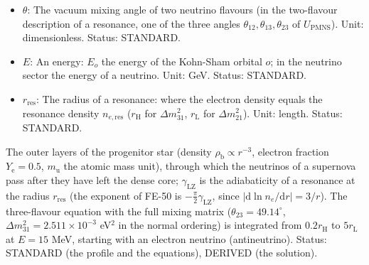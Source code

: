 \documentclass[
  10pt,
]{article}
\begin{document}
\begin{itemize}
  mass, \(m^2 = m_0^2 - \mathrm{i}m_0\Gamma_{\mathrm{bulk}}\) to the
  leading order; in the relic abundance of the particles \(\chi\) their
  mass. Unit: GeV. Status: STANDARD.
\item
  \(\theta\): The vacuum mixing angle of two neutrino flavours (in the
  two-flavour description of a resonance, one of the three angles
  \(\theta_{12}, \theta_{13}, \theta_{23}\) of \(U_{\mathrm{PMNS}}\)).
  Unit: dimensionless. Status: STANDARD.
\item
  \(E\): An energy: \(E_o\) the energy of the Kohn-Sham orbital \(o\);
  in the neutrino sector the energy of a neutrino. Unit: GeV. Status:
  STANDARD.
\item
  \(r_{\mathrm{res}}\): The radius of a resonance: where the electron
  density equals the resonance density \(n_{e,\mathrm{res}}\)
  (\(r_{\mathrm{H}}\) for \(\Delta m^2_{31}\), \(r_{\mathrm{L}}\) for
  \(\Delta m^2_{21}\)). Unit: length. Status: STANDARD.
\end{itemize}

The outer layers of the progenitor star (density
\(\rho_{\mathrm{b}} \propto r^{-3}\), electron fraction
\(Y_{\mathrm{e}} = 0.5\), \(m_{\mathrm{u}}\) the atomic mass unit),
through which the neutrinos of a supernova pass after they have left the
dense core; \(\gamma_{\mathrm{LZ}}\) is the adiabaticity of a resonance
at the radius \(r_{\mathrm{res}}\) (the exponent of FE-50 is
\(-\frac{\pi}{2}\gamma_{\mathrm{LZ}}\), since
\(\lvert\mathrm{d}\ln n_e/\mathrm{d}r\rvert = 3/r\)). The three-flavour
equation with the full mixing matrix (\(\theta_{23} = 49.14^\circ\),
\(\Delta m^2_{31} = 2.511\times10^{-3}\) eV\(^2\) in the normal
ordering) is integrated from \(0.2r_{\mathrm{H}}\) to
\(5r_{\mathrm{L}}\) at \(E = 15\) MeV, starting with an electron
neutrino (antineutrino). Status: STANDARD (the profile and the
equations), DERIVED (the solution).
\end{document}
